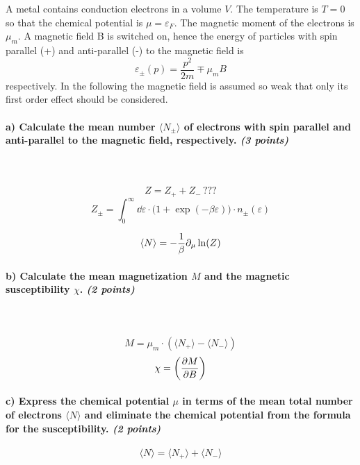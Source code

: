A metal contains conduction electrons in a volume $V$. 
The temperature is $T=0$ so that the chemical potential is 
$\mu=\varepsilon_F$. The magnetic moment of the electrons 
is $\mu_m$. A magnetic field B is switched on, hence the 
energy of particles with spin parallel (+) and anti-parallel 
(-) to the magnetic field is
\begin{equation}
    \varepsilon_\pm(p)=\frac{p^2}{2m}\mp\mu_mB
\end{equation}
respectively. In the following the magnetic field is assumed 
so weak that only its first order effect should be considered.

\paragraph{a) Calculate the mean number $\langle N_\pm\rangle$ 
    of electrons with spin parallel and anti-parallel to the 
    magnetic field, respectively. \textit{(3 points)}
} \ \\
    \\
    \begin{equation}
        Z=Z_++Z_- \, ???
    \end{equation}
    \begin{equation}
        Z_\pm=
        \int_0^{\infty}\dd\varepsilon\cdot\bigg(
            1+\exp(-\beta\varepsilon)
        \bigg)\cdot n_\pm(\varepsilon)
    \end{equation}


    \begin{equation}
        \langle N \rangle
        =-\frac{1}{\beta}\partial_\mu\ln(Z)
    \end{equation}


\paragraph{b) Calculate the mean magnetization $M$ and the magnetic 
    susceptibility $\chi$. \textit{(2 points)}
} \ \\
    \\
    \begin{equation}
        M=\mu_m\cdot(\langle N_+\rangle - \langle N_-\rangle)
    \end{equation}
    \begin{equation}
        \chi=\bigg(\frac{\partial M}{\partial B}\bigg)
    \end{equation}


\paragraph{c) Express the chemical potential $\mu$ in terms of the 
    mean total number of electrons $\langle N\rangle$ and 
    eliminate the chemical potential from the formula 
    for the susceptibility. \textit{(2 points)}
}
    \begin{equation}
        \langle N\rangle
        =\langle N_+\rangle+\langle N_-\rangle
    \end{equation}
